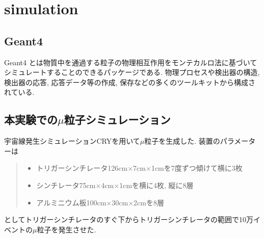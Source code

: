 \chapter{simulation}\label{simulation}
\section{Geant4}
Geant4 とは物質中を通過する粒子の物理相互作用をモンテカルロ法に基づいてシミュレートすることのできるパッケージである.
物理プロセスや検出器の構造, 検出器の応答, 応答データ等の作成, 保存などの多くのツールキットから構成されている.

\section{本実験での$\mu$粒子シミュレーション}
宇宙線発生シミュレーションCRYを用いて$\mu$粒子を生成した.
装置のパラメーターは
    \begin{quote}
        \begin{itemize}
            \item トリガーシンチレータ126cm$\times$7cm$\times$1cmを7度ずつ傾けて横に3枚
            \item シンチレータ75cm$\times$4cm$\times$1cmを横に4枚, 縦に8層
            \item アルミニウム板100cm$\times$30cm$\times$2cmを8層
        \end{itemize}
    \end{quote}
としてトリガーシンチレータのすぐ下からトリガーシンチレータの範囲で10万イベントの$\mu$粒子を発生させた.

